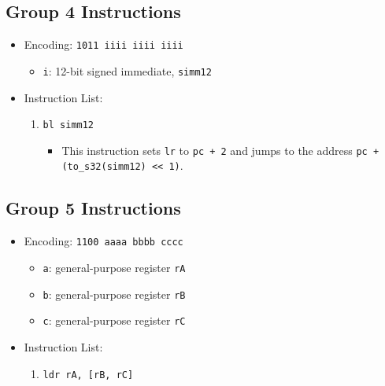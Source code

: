 \documentclass{article}
\begin{document}
	\subsection{Group 4 Instructions}
		\begin{itemize}
		\item Encoding:  \texttt{1011 iiii iiii iiii}
			\begin{itemize}
			\item \texttt{i}:  12-bit signed immediate, \texttt{simm12}
			\end{itemize}
		\item Instruction List:
			\begin{enumerate}
			\item \texttt{bl simm12}
				\begin{itemize}
				\item This instruction sets \texttt{lr} to \texttt{pc + 2}
					and jumps to the address
					\texttt{pc + (to\_s32(simm12) << 1)}.
				\end{itemize}
			\end{enumerate}
		\end{itemize}

	\subsection{Group 5 Instructions}
		\begin{itemize}
		\item Encoding:  \texttt{1100 aaaa bbbb cccc}
			\begin{itemize}
			\item \texttt{a}:  general-purpose register \texttt{rA}
			\item \texttt{b}:  general-purpose register \texttt{rB}
			\item \texttt{c}:  general-purpose register \texttt{rC}
			\end{itemize}
		\item Instruction List:
			\begin{enumerate}
			\item \texttt{ldr rA, [rB, rC]}
			\end{enumerate}
		\end{itemize}
\end{document}
